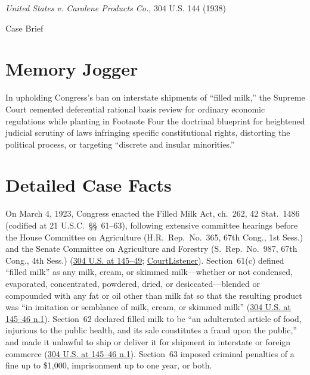 \documentclass[12pt]{article}
\begin{document}
\begin{center}
{\LARGE \textit{United States v. Carolene Products Co.}, 304 U.S. 144 (1938)\par}
\vspace{0.8em}
{\large Case Brief\par}
\end{center}
\vspace{1em}

\section{Memory Jogger}

In upholding Congress's ban on interstate shipments of ``filled milk,'' the Supreme Court cemented deferential rational basis review for ordinary economic regulations while planting in Footnote Four the doctrinal blueprint for heightened judicial scrutiny of laws infringing specific constitutional rights, distorting the political process, or targeting ``discrete and insular minorities.''

\section{Detailed Case Facts}

On March 4, 1923, Congress enacted the Filled Milk Act, ch.~262, 42 Stat.~1486 (codified at 21 U.S.C.~\S\S~61--63), following extensive committee hearings before the House Committee on Agriculture (H.R.~Rep.~No.~365, 67th Cong., 1st Sess.) and the Senate Committee on Agriculture and Forestry (S.~Rep.~No.~987, 67th Cong., 4th Sess.) (\href{https://supreme.justia.com/cases/federal/us/304/144/}{304 U.S. at 145--49}; \href{https://www.courtlistener.com/opinion/103017/united-states-v-carolene-products-co/}{CourtListener}). Section~61(c) defined ``filled milk'' as any milk, cream, or skimmed milk---whether or not condensed, evaporated, concentrated, powdered, dried, or desiccated---blended or compounded with any fat or oil other than milk fat so that the resulting product was ``in imitation or semblance of milk, cream, or skimmed milk'' (\href{https://supreme.justia.com/cases/federal/us/304/144/}{304 U.S. at 145--46 n.1}). Section~62 declared filled milk to be ``an adulterated article of food, injurious to the public health, and its sale constitutes a fraud upon the public,'' and made it unlawful to ship or deliver it for shipment in interstate or foreign commerce (\href{https://supreme.justia.com/cases/federal/us/304/144/}{304 U.S. at 145--46 n.1}). Section~63 imposed criminal penalties of a fine up to \$1,000, imprisonment up to one year, or both.
\end{document}

